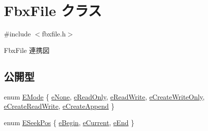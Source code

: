 \hypertarget{class_fbx_file}{}\section{Fbx\+File クラス}
\label{class_fbx_file}


{\ttfamily \#include $<$fbxfile.\+h$>$}



Fbx\+File 連携図
\subsection*{公開型}
\begin{DoxyCompactItemize}
\item 
enum \hyperlink{class_fbx_file_a0370e8fd17b3658f718e1350a6a6f462}{E\+Mode} \{ \newline
\hyperlink{class_fbx_file_a0370e8fd17b3658f718e1350a6a6f462a176e2ccdd9e671698ea8f6f16e41d906}{e\+None}, 
\hyperlink{class_fbx_file_a0370e8fd17b3658f718e1350a6a6f462a7b582fd52d7c01e076ef4d30d3ca7151}{e\+Read\+Only}, 
\hyperlink{class_fbx_file_a0370e8fd17b3658f718e1350a6a6f462a6210f903e353d976f304563453cf34da}{e\+Read\+Write}, 
\hyperlink{class_fbx_file_a0370e8fd17b3658f718e1350a6a6f462ae329198f644b68a3bbf655309eff07c9}{e\+Create\+Write\+Only}, 
\newline
\hyperlink{class_fbx_file_a0370e8fd17b3658f718e1350a6a6f462afce41267d2567926e7983b1193991a49}{e\+Create\+Read\+Write}, 
\hyperlink{class_fbx_file_a0370e8fd17b3658f718e1350a6a6f462a7b54172ce9f59ecc1746a4b6df0a064e}{e\+Create\+Append}
 \}
\item 
enum \hyperlink{class_fbx_file_aba91fe59f9c0a4c84a92f13c0c27deec}{E\+Seek\+Pos} \{ \hyperlink{class_fbx_file_aba91fe59f9c0a4c84a92f13c0c27deeca7a474ae0aa6f46b8becdfe54208f928e}{e\+Begin}, 
\hyperlink{class_fbx_file_aba91fe59f9c0a4c84a92f13c0c27deecaf2653dc9849e794feee37a015d80b098}{e\+Current}, 
\hyperlink{class_fbx_file_aba91fe59f9c0a4c84a92f13c0c27deeca1ab3eb84e8694fd4e63d0c864b12508d}{e\+End}
 \}
\end{DoxyCompactItemize}
